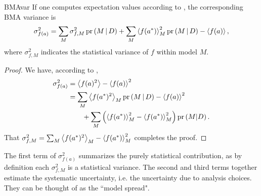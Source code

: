\begin{theorem}{}{BMAvar}
If one computes expectation values according to ,
the corresponding BMA variance is
$$
\sigma^2_{f(a)}=
\sum_M\sigma^2_{f,M}\pr{M\given D}
+\sum_M\ev{f(a^*)}_M^2\pr{M\given D}
-\ev{f(a)},
$$
where $\sigma^2_{f,M}$ indicates the statistical variance of $f$
within model $M$.
\begin{proof}
We have, according to ,
\begin{equation}\begin{aligned}
\sigma^2_{f(a)} &= \ev{f(a)^2}-\ev{f(a)}^2\\
&= \sum_M\ev{f(a^*)^2}_M\pr{M\given D}
-\ev{f(a)}^2\\
&~~~~~~+\sum_M\left(\ev{f(a^*)}_M^2-\ev{f(a^*)}_M^2
\right)\pr{M|D}.
\end{aligned}\end{equation}
That 
$\sigma^2_{f,M}=\sum_M\ev{f(a^*)^2}_M-\ev{f(a^*)}_M^2$
completes the proof.
\end{proof}
\end{theorem}

The first term of $\sigma^2_{f(a)}$ summarizes the purely statistical
contribution, as by definition each $\sigma^2_{f,M}$ is a statistical variance.
The second and third terms together estimate the systematic uncertainty, i.e.
the uncertainty due to analysis choices. 
They can be thought of as the ``model spread".



